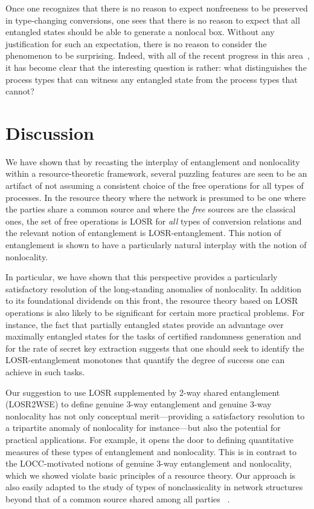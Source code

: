 \documentclass[12pt]{article}
\theoremstyle{plain}
\theoremstyle{definition}
\begin{document}
Once one recognizes that there is no reason to expect nonfreeness to be preserved in type-changing conversions,
one sees that there is no reason to expect that all entangled states should be able to generate a nonlocal box.
 Without any justification for such an expectation, there is no reason to consider the phenomenon to be surprising. 
Indeed, with all of the recent progress in this area~\cite{gallego2014nonlocality,bowles2018device}, it has become clear that the interesting question is rather: what distinguishes the process types that can witness any entangled state from the process types that cannot?

\section{Discussion}\label{sec:Discussion}



  
 We have shown that by recasting the interplay of entanglement and nonlocality within a resource-theoretic framework,  several puzzling features 
 are seen to be an artifact of 
 not assuming a consistent choice of the free operations for all types of processes.   
 In the resource theory where the network is presumed to be one where the parties share a common source and where the {\em free} sources are the classical ones, the set of free operations is LOSR for {\em all} types of conversion relations and the relevant notion of entanglement is LOSR-entanglement.   This notion of entanglement is shown to have a particularly natural interplay with the notion of nonlocality.

In particular, we have shown that this perspective provides a particularly satisfactory resolution of the long-standing anomalies of nonlocality. 
   In addition to its foundational dividends on this front, the resource theory based on  LOSR operations is also likely to be significant for certain more practical problems.  For instance, the fact that partially entangled states provide an advantage over maximally entangled states for the tasks of certified randomness generation \cite{Acin2012randomnessvsnonlocality} and for the rate of secret key extraction \cite{Scarani2006QKD,Acin2006QKD} suggests that one should seek to identify the LOSR-entanglement monotones that quantify the degree of success one can achieve in such tasks.  


Our suggestion to use LOSR supplemented by 2-way shared entanglement (LOSR2WSE) to define genuine 3-way entanglement and genuine 3-way nonlocality has not only conceptual merit---providing a satisfactory resolution to a tripartite anomaly of nonlocality for instance---but also the potential for practical applications.  For example, it opens the door to defining quantitative measures of these types of entanglement and nonlocality. 
This is in contrast to the LOCC-motivated notions of genuine 3-way entanglement and nonlocality, which we showed violate basic principles of a resource theory.  Our approach is also easily adapted to the study of types of nonclassicality in network structures beyond that of a common source shared among all parties
 ~\cite{Henson2014,Fritz2012beyondBell,Wolfe2016inflation}.
\end{document}
